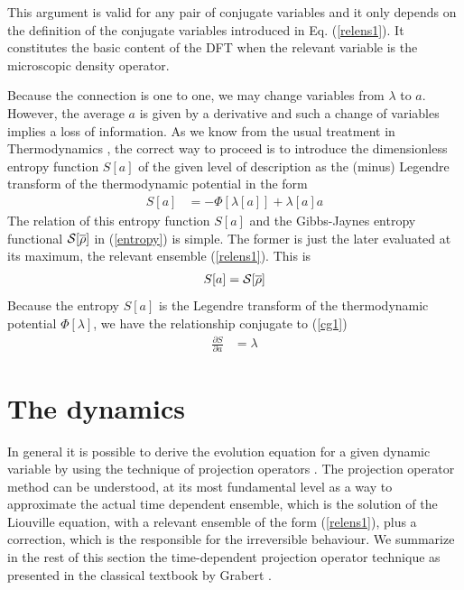 \documentclass[a4paper,openright,12pt]{book}
\begin{document}
This argument is  valid for  any pair  of conjugate variables  and it
only depends on  the definition of the  conjugate variables introduced
in Eq. (\ref{relens1}).  It constitutes  the basic content of the DFT
when the relevant variable is the microscopic density operator.

Because the  connection is one  to one,  we may change  variables from
$\lambda$ to $a$.   However, the average $a$ is given  by a derivative
and such a  change of variables implies a loss  of information.  As we
know from the usual treatment in Thermodynamics \cite{Callen1960}, the
correct way to proceed is to  introduce the dimensionless entropy function $S[a]$ of
the given  level of description  as the (minus) Legendre  transform of
the thermodynamic potential in the form
\begin{align}
S[a] &=-\Phi[\lambda[a]]+\lambda[a] a
\label{entropya}\end{align}
The  relation of  this entropy  function $S[a]$  and the  Gibbs-Jaynes
entropy functional  ${\cal S}[\overline{\rho}]$ in  (\ref{entropy}) is
simple. The  former is just  the later  evaluated at its  maximum, the
relevant ensemble (\ref{relens1}). This is
\begin{align}
S[a]={\cal  S}[\overline{\rho}]
\end{align}
Because  the  entropy   $S[a]$  is  the  Legendre   transform  of  the
thermodynamic  potential  $\Phi[\lambda]$,  we have  the  relationship
conjugate to (\ref{cg1})
\begin{align}
  \frac{\partial S}{\partial a}&=\lambda
\label{e3}
\end{align}


\section{The dynamics}\label{sec:Grabert}
In general it is possible to derive the evolution equation for a given
dynamic  variable  by  using  the technique  of  projection  operators
\cite{Kawasaki1973a,Grabert1982}. The projection operator method can be
understood, at its most fundamental level  as a way to approximate the
actual time dependent ensemble, which is the solution of the Liouville
equation, with a relevant  ensemble of the form (\ref{relens1}),
plus  a correction,  which  is the  responsible  for the  irreversible
behaviour. We  summarize   in  the   rest  of   this  section   the
time-dependent  projection  operator  technique as  presented  in  the
classical  textbook  by Grabert  \cite{Grabert1982}.   
\end{document}
